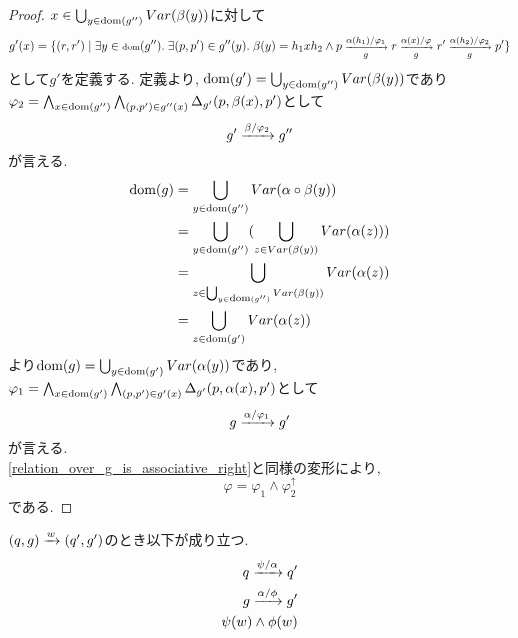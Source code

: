 \documentclass[uplatex,dvipdfmx,a4j]{jsreport}
\begin{document}
  \begin{proof}
    $x \in \bigcup_{y \in \scriptsize \dom(g'')} Var(\beta(y))$に対して
    \[
    g'(x) = \{ (r, r') \mid \exists y \in \scriptsize \dom(g'').\ \exists (p, p') \in g''(y).\
    \beta(y) = h_1 x h_2 \land p \transarrow{\alpha(h_1) / \varphi_1}{g} r
    \transarrow{\alpha(x) / \varphi}{g} r' \transarrow{\alpha(h_2) / \varphi_2}{g} p'\}
    \]
    として$g'$を定義する.
    定義より, $\dom(g') = \bigcup_{y \in \scriptsize \dom(g'')} Var(\beta(y))$であり
    $\varphi_2 = \bigwedge_{x \in \scriptsize \dom(g'')} \bigwedge_{(p, p') \in g''(x)}
    \Delta_{g'}(p, \beta(x), p')$として
    \[
      g' \transarrow{\beta / \varphi_2}{} g''
    \]
    が言える. \\
    \begin{align*}
      \dom(g) &= \bigcup_{y \in \scriptsize \dom(g'')} Var(\alpha \circ \beta(y)) \\
             &= \bigcup_{y \in \scriptsize \dom(g'')} (\bigcup_{z \in Var(\beta(y))} Var(\alpha(z))) \\
             &= \bigcup_{z \in \scriptsize \bigcup_{y \in \dom(g'')} Var(\beta(y))} Var(\alpha(z)) \\
             &= \bigcup_{z \in \scriptsize \dom(g')} Var(\alpha(z))
    \end{align*}
    より$\dom(g) = \bigcup_{y \in \scriptsize \dom(g')} Var(\alpha(y))$であり,
    $\varphi_1 = \bigwedge_{x \in \scriptsize \dom(g')} \bigwedge_{(p, p') \in g'(x)}
    \Delta_{g'}(p, \alpha(x), p')$として
    \[
      g \transarrow{\alpha / \varphi_1}{} g'
    \]
    が言える. \\
    \ref{relation_over_g_is_associative_right}と同様の変形により,
    \[
      \varphi = \varphi_1 \land \varphi_2^\uparrow
    \]
    である.
  \end{proof}

  \begin{lemma} \label{S_transition_and_g_tansition_are_derived_from_A'_transition}
    $(q, g) \transarrow{w}{} (q', g')$のとき以下が成り立つ.
    \begin{align*}
      q \transarrow{\psi / \alpha}{} q' \\
      g \transarrow{\alpha / \phi}{} g' \\
      \psi(w) \land \phi(w)
    \end{align*}
  \end{lemma}
\end{document}
